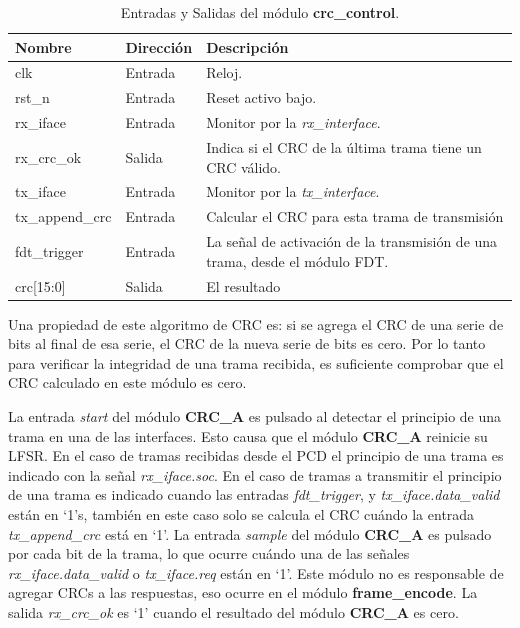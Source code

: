 \documentclass[a4paper, twoside, 11pt]{report}
\begin{document}
\begin{table}[htb]
  \centering
  \tablezebra
  \begin{tabulary}{\linewidth}{l|l|L}
    \textbf{Nombre}&\textbf{Dirección}&\textbf{Descripción} \\
    \hline
    clk&Entrada&Reloj. \\
    rst\_n&Entrada&Reset activo bajo. \\
    rx\_iface&Entrada&Monitor por la \textit{rx\_interface}. \\
    rx\_crc\_ok&Salida&Indica si el CRC de la última trama tiene un CRC válido. \\
    tx\_iface&Entrada&Monitor por la \textit{tx\_interface}. \\
    tx\_append\_crc&Entrada&Calcular el CRC para esta trama de transmisión \\
    fdt\_trigger&Entrada&La señal de activación de la transmisión de una trama, desde el módulo FDT. \\
    crc[15:0]&Salida&El resultado \\
  \end{tabulary}
  \caption{Entradas y Salidas del módulo \textbf{crc\_control}.}
  \label{tab:ports_crc_control}
\end{table}

Una propiedad de este algoritmo de CRC es: si se agrega el CRC de una serie de bits al final de esa serie, el CRC de la nueva serie de bits es cero. Por lo tanto para verificar la integridad de una trama recibida, es suficiente comprobar que el CRC calculado en este módulo es cero.

La entrada \textit{start} del módulo \textbf{CRC\_A} es pulsado al detectar el principio de una trama en una de las interfaces. Esto causa que el módulo \textbf{CRC\_A} reinicie su LFSR. En el caso de tramas recibidas desde el PCD el principio de una trama es indicado con la señal \textit{rx\_iface.soc}. En el caso de tramas a transmitir el principio de una trama es indicado cuando las entradas \textit{fdt\_trigger}, y \textit{tx\_iface.data\_valid} están en ‘1’s, también en este caso solo se calcula el CRC cuándo la entrada \textit{tx\_append\_crc} está en ‘1’. La entrada \textit{sample} del módulo \textbf{CRC\_A} es pulsado por cada bit de la trama, lo que ocurre cuándo una de las señales \textit{rx\_iface.data\_valid} o \textit{tx\_iface.req} están en ‘1’. Este módulo no es responsable de agregar CRCs a las respuestas, eso ocurre en el módulo \textbf{frame\_encode}. La salida \textit{rx\_crc\_ok} es ‘1’ cuando el resultado del módulo \textbf{CRC\_A} es cero.
\end{document}
